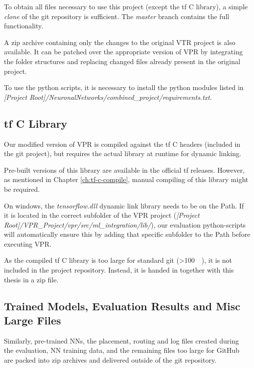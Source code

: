 To obtain all files necessary to use this project (except the \gls{tf} C library), a simple \textit{clone} of the git repository is sufficient. The \textit{master} branch contains the full functionality.

A zip archive containing only the changes to the original \gls{VTR} project is also available. It can be patched over the appropriate version of \gls{VPR} by integrating the folder structures and replacing changed files already present in the original project.

To use the python scripts, it is necessary to install the python modules listed in \textit{[Project Root]/NeuronalNetworks/combined\_project/requirements.txt}.

\subsection{\gls{tf} C Library}

Our modified version of \gls{VPR} is compiled against the \gls{tf} C headers (included in the git project), but requires the actual library at runtime for dynamic linking.

Pre-built versions of this library are available in the official \gls{tf} releases. However, as mentioned in Chapter \ref{ch:tf-c-compile}, manual compiling of this library might be required.

On windows, the \textit{tensorflow.dll} dynamic link library needs to be on the Path. If it is located in the correct subfolder of the \gls{VPR} project (\textit{[Project Root]/VPR\_Project/vpr/src/ml\_integration/lib/}), our evaluation python-scripts will automatically ensure this by adding that specific subfolder to the Path before executing \gls{VPR}.

As the compiled \gls{tf} C library is too large for standard git (>\SI{100}{\mega\byte}), it is not included in the project repository. Instead, it is handed in together with this thesis in a zip file.

\subsection{Trained Models, Evaluation Results and Misc Large Files}

Similarly, pre-trained \glspl{NN}, the placement, routing and log files created during the evaluation, \gls{NN} training data, and the remaining files too large for GitHub are packed into zip archives and delivered outside of the git repository.

